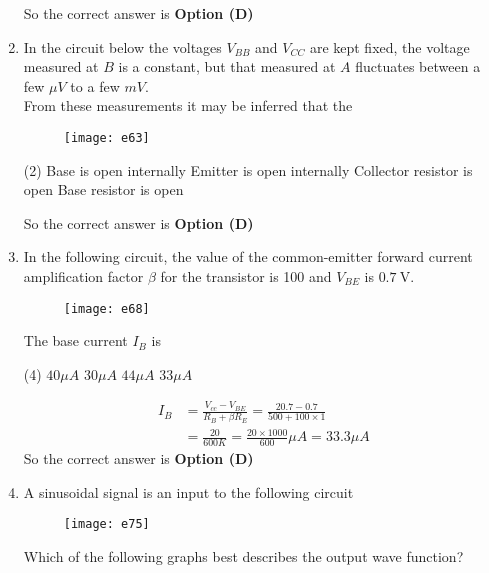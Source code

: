 \begin{enumerate}
\begin{answer}
So the correct answer is \textbf{Option (D)}
\end{answer}
	\item In the circuit below the voltages $V_{B B}$ and $V_{C C}$ are kept fixed, the voltage measured at $B$ is a constant, but that measured at $A$ fluctuates between a few $\mu V$ to a few $m V$.\\
	From these measurements it may be inferred that the
	{}
\begin{figure}[H]
\centering
\texttt{[image: e63]}
\end{figure}
\begin{tasks}(2)
\task[\textbf{A.}] Base is open internally
\task[\textbf{B.}] Emitter is open internally
\task[\textbf{C.}] Collector resistor is open
\task[\textbf{D.}] Base resistor is open
\end{tasks}
\begin{answer}
So the correct answer is \textbf{Option (D)}
\end{answer}
	\item In the following circuit, the value of the common-emitter forward current amplification factor $\beta$ for the transistor is 100 and $V_{B E}$ is $0.7 \mathrm{~V}$.\\
	\begin{figure}[H]
		\centering
		\texttt{[image: e68]}
	\end{figure}
	The base current $I_{B}$ is
{	}
\begin{tasks}(4)
\task[\textbf{A.}] $40 \mu A$
\task[\textbf{B.}] $30 \mu A$
\task[\textbf{C.}] $44 \mu A$
\task[\textbf{D.}] $33 \mu A$
\end{tasks}
\begin{answer}
\begin{align*}
I_{B}&=\frac{V_{c c}-V_{B E}}{R_{B}+\beta R_{E}}=\frac{20.7-0.7}{500+100 \times 1}\\&=\frac{20}{600 K}=\frac{20 \times 1000}{600} \mu A=33.3 \mu A
\end{align*}
So the correct answer is \textbf{Option (D)}
\end{answer}
	\item A sinusoidal signal is an input to the following circuit\\
	\begin{figure}[H]
		\centering
		\texttt{[image: e75]}
	\end{figure}
	Which of the following graphs best describes the output wave function?

\end{enumerate}
